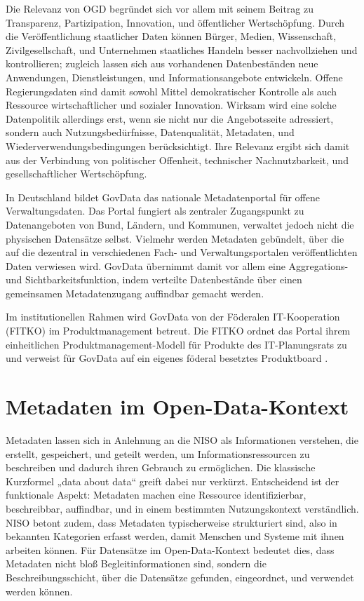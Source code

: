 Die Relevanz von OGD begründet sich vor allem mit seinem Beitrag zu Transparenz, Partizipation, Innovation, und öffentlicher Wertschöpfung. Durch die Veröffentlichung staatlicher Daten können Bürger, Medien, Wissenschaft, Zivilgesellschaft, und Unternehmen staatliches Handeln besser nachvollziehen und kontrollieren; zugleich lassen sich aus vorhandenen Datenbeständen neue Anwendungen, Dienstleistungen, und Informationsangebote entwickeln. Offene Regierungsdaten sind damit sowohl Mittel demokratischer Kontrolle als auch Ressource wirtschaftlicher und sozialer Innovation. Wirksam wird eine solche Datenpolitik allerdings erst, wenn sie nicht nur die Angebotsseite adressiert, sondern auch Nutzungsbedürfnisse, Datenqualität, Metadaten, und Wiederverwendungsbedingungen berücksichtigt. Ihre Relevanz ergibt sich damit aus der Verbindung von politischer Offenheit, technischer Nachnutzbarkeit, und gesellschaftlicher Wertschöpfung. \cite{Ubaldi2013OGD, OECD2020OURdata}

In Deutschland bildet GovData das nationale Metadatenportal für offene Verwaltungsdaten. Das Portal fungiert als zentraler Zugangspunkt zu Datenangeboten von Bund, Ländern, und Kommunen, verwaltet jedoch nicht die physischen Datensätze selbst. Vielmehr werden Metadaten gebündelt, über die auf die dezentral in verschiedenen Fach- und Verwaltungsportalen veröffentlichten Daten verwiesen wird. GovData übernimmt damit vor allem eine Aggregations- und Sichtbarkeitsfunktion, indem verteilte Datenbestände über einen gemeinsamen Metadatenzugang auffindbar gemacht werden. \cite{BmdsOpenData}

Im institutionellen Rahmen wird GovData von der Föderalen IT-Kooperation (FITKO) im  Produktmanagement betreut.
Die FITKO ordnet das Portal ihrem einheitlichen Pro\-dukt\-ma\-nage\-ment-Modell für Produkte des IT-Planungsrats zu und verweist für GovData auf ein eigenes föderal besetztes Produktboard \cite{FitkoGovdata}.

\section{Metadaten im Open-Data-Kontext}

Metadaten lassen sich in Anlehnung an die \acrfull{NISO} als Informationen verstehen, die erstellt, gespeichert, und geteilt werden, um Informationsressourcen zu beschreiben und dadurch ihren Gebrauch zu ermöglichen. Die klassische Kurzformel „data about data“ greift dabei nur verkürzt. Entscheidend ist der funktionale Aspekt: Metadaten machen eine Ressource identifizierbar, beschreibbar, auffindbar, und in einem bestimmten Nutzungskontext verständlich. NISO betont zudem, dass Metadaten typischerweise strukturiert sind, also in bekannten Kategorien erfasst werden, damit Menschen und Systeme mit ihnen arbeiten können. Für Datensätze im Open-Data-Kontext bedeutet dies, dass Metadaten nicht bloß Begleitinformationen sind, sondern die Beschreibungsschicht, über die Datensätze gefunden, eingeordnet, und verwendet werden können. \cite{Riley2017MetadataPrimer}

